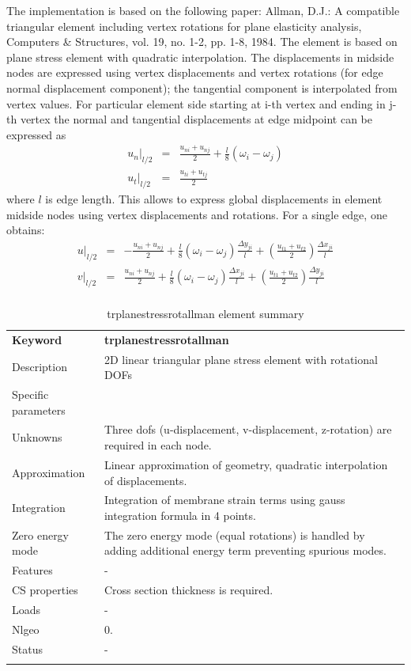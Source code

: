 \documentclass[a4paper]{article}
\newcommand{\del}[2]{\mbox{$\displaystyle\frac{#1}{#2}$}}
\newcommand{\templabel}{}%
\newcommand{\tempcaption}{}%
\newcounter{nelpar}
\newenvironment{elementsummary}[5]{%
  \gdef\tempcaption{#4}%
  \gdef\templabel{#5}%
  \setcounter{nelpar}{0}%
  \begin{center} %
    \begin{table}[!htb] %
      \begin{tabular}{|l|p{9cm}|}\hline %
        {\bf Keyword} & \bf{#1}\\ %
        {Description} & {#2}\\ %
        {Specific parameters} & {#3}\\ \hline %
}{
  \\ \hline %
      \end{tabular}%
      \caption{\tempcaption}%
      \label{\templabel}%
    \end{table}%
  \end{center}%
}
\newcommand{\elementDescription}[2]{{#1} & {#2}\\}
\begin{document}
The implementation is based on the following paper: Allman, D.J.: A compatible triangular element including vertex rotations for plane elasticity analysis, Computers \& Structures, vol. 19, no. 1-2, pp. 1-8, 1984.
The element is based on plane stress element with quadratic interpolation. The displacements in midside nodes are expressed using vertex displacements and vertex rotations (for edge normal displacement component); 
the tangential component is interpolated from vertex values.
For particular element side starting at i-th vertex and ending in j-th vertex the normal and tangential displacements at edge midpoint can be expressed as
\begin{eqnarray*}
u_n\vert_{l/2} &=& \del{u_{ni}+u_{nj}}{2}+\del{l}{8}(\omega_i-\omega_j)\\
u_t\vert_{l/2} &=& \del{u_{ti}+u_{tj}}{2}
\end{eqnarray*}
where $l$ is edge length. This allows to express global displacements in element midside nodes using vertex displacements and rotations. For a single edge, one obtains:
\begin{eqnarray*}
u\vert_{l/2} &=&-\del{u_{ni}+u_{nj}}{2}+\del{l}{8}(\omega_i-\omega_j)\del{\Delta y_{ji}}{l}+(\del{u_{t1}+u_{t2}}{2})\del{\Delta x_{ji}}{l}\\
v\vert_{l/2} &=& \del{u_{ni}+u_{nj}}{2}+\del{l}{8}(\omega_i-\omega_j)\del{\Delta x_{ji}}{l}+(\del{u_{t1}+u_{t2}}{2})\del{\Delta y_{ji}}{l}\\
\end{eqnarray*}

\begin{elementsummary}{trplanestressrotallman}{2D linear triangular plane stress element with rotational DOFs}{}{trplanestressrotallman element summary}{TrPlaneStressRotAllmansummary}
\elementDescription{Unknowns}{Three dofs (u-displacement, v-displacement, z-rotation) are required in each node.}
\elementDescription{Approximation}{Linear approximation of geometry, quadratic interpolation of displacements.}
\elementDescription{Integration}{Integration of membrane strain terms using gauss integration formula in 4 points.}
\elementDescription{Zero energy mode}{The zero energy mode (equal rotations) is handled by adding additional energy term preventing spurious modes.}

\elementDescription{Features}{-}
\elementDescription{CS properties}{Cross section thickness is required.}
\elementDescription{Loads}{-}
\elementDescription{Nlgeo}{0.}
\elementDescription{Status}{-}
\end{elementsummary}
\end{document}
